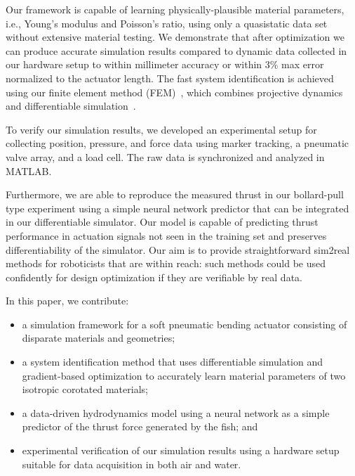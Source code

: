 Our framework is capable of learning physically-plausible material parameters, i.e., Young's modulus and Poisson's ratio, using only a quasistatic data set without extensive material testing. We demonstrate that after optimization we can produce accurate simulation results compared to dynamic data collected in our hardware setup to within millimeter accuracy or within $3\%$ max error normalized to the actuator length. The fast system identification is achieved using our finite element method (FEM)~\cite{du2021diffpd,ma2021diffaqua}, which combines projective dynamics~\cite{bouaziz2014projective} and differentiable simulation~\cite{hu2019difftaichi}.

To verify our simulation results, we developed an experimental setup for collecting position, pressure, and force data using marker tracking, a pneumatic valve array, and a load cell. The raw data is synchronized and analyzed in MATLAB.

Furthermore, we are able to reproduce the measured thrust in our bollard-pull type experiment using a simple neural network predictor that can be integrated in our differentiable simulator. Our model is capable of predicting thrust performance in actuation signals not seen in the training set and preserves differentiability of the simulator. Our aim is to provide straightforward sim2real methods for roboticists that are within reach: such methods could be used confidently for design optimization if they are verifiable by real data.

In this paper, we contribute:
\begin{itemize}
    \item a simulation framework for a soft pneumatic bending actuator consisting of disparate materials and geometries;
    \item a system identification method that uses differentiable simulation and gradient-based optimization to accurately learn material parameters of two isotropic corotated materials;
    \item a data-driven hydrodynamics model using a neural network as a simple predictor of the thrust force generated by the fish; and
    \item experimental verification of our simulation results using a hardware setup suitable for data acquisition in both air and water.
\end{itemize}
